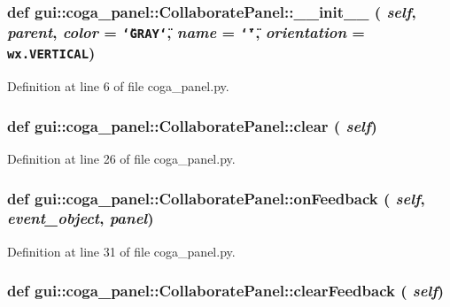 \subsubsection{\setlength{\rightskip}{0pt plus 5cm}def gui::coga\_\-panel::CollaboratePanel::\_\-\_\-init\_\-\_\- ( {\em self},  {\em parent},  {\em color} = {\tt \char`\"{}GRAY\char`\"{}},  {\em name} = {\tt \char`\"{}\char`\"{}},  {\em orientation} = {\tt wx.VERTICAL})}\label{classgui_1_1coga__panel_1_1CollaboratePanel_f317f8d2b36941f993c3da47c916deaa}




Definition at line 6 of file coga\_\-panel.py.
\subsubsection{\setlength{\rightskip}{0pt plus 5cm}def gui::coga\_\-panel::CollaboratePanel::clear ( {\em self})}\label{classgui_1_1coga__panel_1_1CollaboratePanel_babd0968e11975dcaf761ec00821dbf5}




Definition at line 26 of file coga\_\-panel.py.
\subsubsection{\setlength{\rightskip}{0pt plus 5cm}def gui::coga\_\-panel::CollaboratePanel::onFeedback ( {\em self},  {\em event\_\-object},  {\em panel})}\label{classgui_1_1coga__panel_1_1CollaboratePanel_b130d8c0c8a8b56b6c01d8ab49ec4e96}




Definition at line 31 of file coga\_\-panel.py.
\subsubsection{\setlength{\rightskip}{0pt plus 5cm}def gui::coga\_\-panel::CollaboratePanel::clearFeedback ( {\em self})}\label{classgui_1_1coga__panel_1_1CollaboratePanel_eccd75e2baf17f00909cff2e2d44251b}





